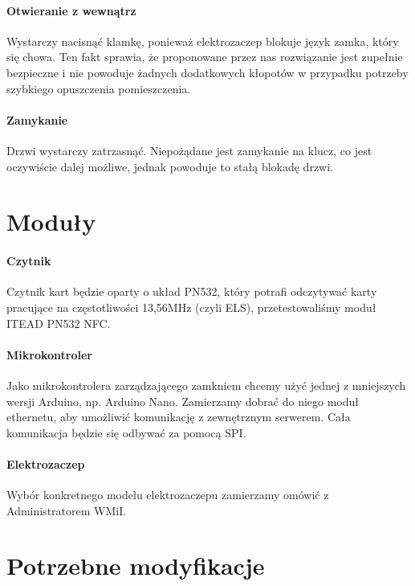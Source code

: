 \documentclass[paper=a4, fontsize=11pt]{scrartcl} %
\numberwithin{equation}{section} %
\numberwithin{figure}{section} %
\numberwithin{table}{section} %
\begin{document}
\paragraph{Otwieranie z wewnątrz}

Wystarczy nacisnąć klamkę, ponieważ elektrozaczep blokuje język zamka, który się chowa. Ten fakt sprawia, że proponowane przez nas rozwiązanie
jest zupełnie bezpieczne i nie powoduje żadnych dodatkowych kłopotów w przypadku potrzeby szybkiego opuszczenia pomieszczenia.

\paragraph{Zamykanie}

Drzwi wystarczy zatrzasnąć. Niepożądane jest zamykanie na klucz, co jest oczywiście dalej możliwe, jednak powoduje to stałą blokadę drzwi.


\section{Moduły}

\paragraph{Czytnik}

Czytnik kart będzie oparty o układ PN532, który potrafi odczytywać karty pracujące na częstotliwości 13,56MHz (czyli ELS), przetestowaliśmy moduł
ITEAD PN532 NFC.

\paragraph{Mikrokontroler}

Jako mikrokontrolera zarządzającego zamkniem chcemy użyć jednej z mniejszych wersji Arduino, np. Arduino Nano. Zamierzamy dobrać do
niego moduł ethernetu, aby umożliwić komunikację z zewnętrznym serwerem. Cała komunikacja będzie się odbywać za pomocą SPI.

\paragraph{Elektrozaczep}

Wybór konkretnego modelu elektrozaczepu zamierzamy omówić z Administratorem WMiI.

\section{Potrzebne modyfikacje}
\end{document}
